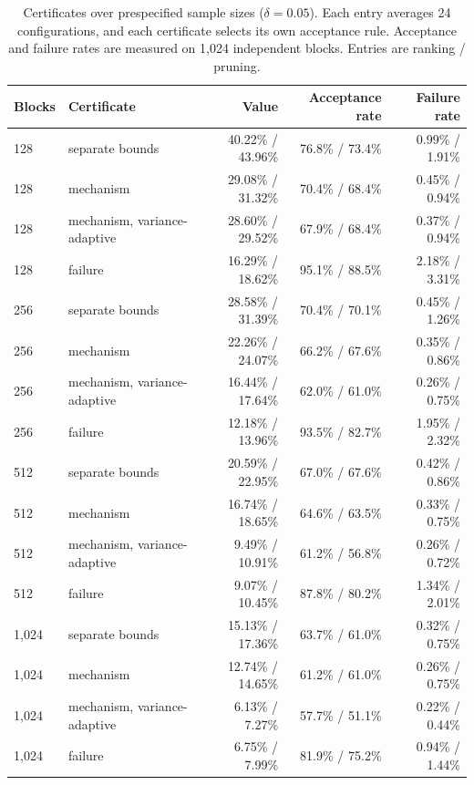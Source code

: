 \begin{table}[tbp]
\centering


\small
\begin{tabular}{llrrr}
\toprule
Blocks & Certificate & Value & Acceptance rate & Failure rate \\
\midrule
128 & separate bounds & 40.22\% / 43.96\% & 76.8\% / 73.4\% & 0.99\% / 1.91\% \\
128 & mechanism & 29.08\% / 31.32\% & 70.4\% / 68.4\% & 0.45\% / 0.94\% \\
128 & mechanism, variance-adaptive & 28.60\% / 29.52\% & 67.9\% / 68.4\% & 0.37\% / 0.94\% \\
128 & failure & 16.29\% / 18.62\% & 95.1\% / 88.5\% & 2.18\% / 3.31\% \\
\midrule
256 & separate bounds & 28.58\% / 31.39\% & 70.4\% / 70.1\% & 0.45\% / 1.26\% \\
256 & mechanism & 22.26\% / 24.07\% & 66.2\% / 67.6\% & 0.35\% / 0.86\% \\
256 & mechanism, variance-adaptive & 16.44\% / 17.64\% & 62.0\% / 61.0\% & 0.26\% / 0.75\% \\
256 & failure & 12.18\% / 13.96\% & 93.5\% / 82.7\% & 1.95\% / 2.32\% \\
\midrule
512 & separate bounds & 20.59\% / 22.95\% & 67.0\% / 67.6\% & 0.42\% / 0.86\% \\
512 & mechanism & 16.74\% / 18.65\% & 64.6\% / 63.5\% & 0.33\% / 0.75\% \\
512 & mechanism, variance-adaptive & 9.49\% / 10.91\% & 61.2\% / 56.8\% & 0.26\% / 0.72\% \\
512 & failure & 9.07\% / 10.45\% & 87.8\% / 80.2\% & 1.34\% / 2.01\% \\
\midrule
1{,}024 & separate bounds & 15.13\% / 17.36\% & 63.7\% / 61.0\% & 0.32\% / 0.75\% \\
1{,}024 & mechanism & 12.74\% / 14.65\% & 61.2\% / 61.0\% & 0.26\% / 0.75\% \\
1{,}024 & mechanism, variance-adaptive & 6.13\% / 7.27\% & 57.7\% / 51.1\% & 0.22\% / 0.44\% \\
1{,}024 & failure & 6.75\% / 7.99\% & 81.9\% / 75.2\% & 0.94\% / 1.44\% \\
\bottomrule
\end{tabular}

\small
\caption{Certificates over prespecified sample sizes ($\delta=0.05$). Each entry averages 24 configurations, and each certificate selects its own acceptance rule. Acceptance and failure rates are measured on 1{,}024 independent blocks. Entries are ranking / pruning.}
\label{tab:app-d-certificates}
\end{table}

